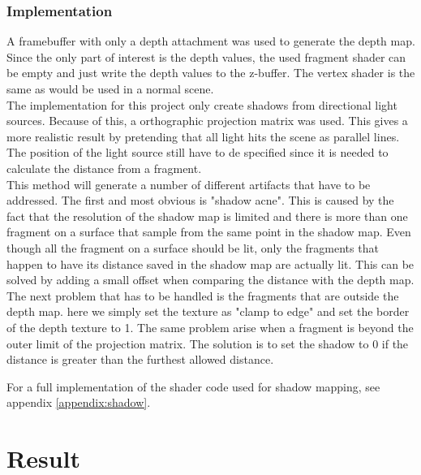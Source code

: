 \documentclass{article}
\begin{document}
  			\subsubsection*{Implementation}
  				
  				A framebuffer with only a depth attachment was used to generate the depth map. Since the only part of interest is the depth values, the used fragment shader can be empty and just write the depth values to the z-buffer. The vertex shader is the same as would be used in a normal scene. \\
  				
  				The implementation for this project only create shadows from directional light sources. Because of this, a orthographic projection matrix was used. This gives a more realistic result by pretending that all light hits the scene as parallel lines. The position of the light source still have to de specified since it is needed to calculate the distance from a fragment. \\
  				
  				This method will generate a number of different artifacts that have to be addressed. The first and most obvious is "shadow acne". This is caused by the fact that the resolution of the shadow map is limited and there is more than one fragment on a surface that sample from the same point in the shadow map. Even though all the fragment on a surface should be lit, only the fragments that happen to have its distance saved in the shadow map are actually lit. This can be solved by adding a small offset when comparing the distance with the depth map. \\
  				
  				The next problem that has to be handled is the fragments that are outside the depth map. here we simply set the texture as "clamp to edge" and set the border of the depth texture to 1. The same problem arise when a fragment is beyond the outer limit of the projection matrix. The solution is to set the shadow to 0 if the distance is greater than the furthest allowed distance.
  				
  				For a full implementation of the shader code used for shadow mapping, see appendix \ref{appendix:shadow}.
  				
  	\section{Result}
  		
  		
  		
  		
\end{document}

